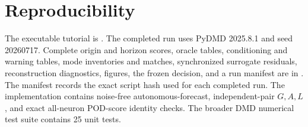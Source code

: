 \documentclass[11pt]{article}
\begin{document}
\section*{Reproducibility}

The executable tutorial is
.  The completed
run uses PyDMD 2025.8.1 and seed 20260717.  Complete origin and horizon scores,
oracle tables, conditioning and warning tables, mode inventories and matches,
synchronized surrogate residuals, reconstruction diagnostics, figures, the
frozen decision, and a run manifest are in
.  The manifest records the
exact script hash used for each completed run.  The implementation contains
noise-free autonomous-forecast, independent-pair \(G,A,L\), and exact
all-neuron POD-score identity checks.  The broader DMD numerical test suite
contains 25 unit tests.
\end{document}
